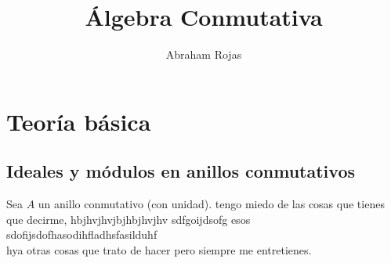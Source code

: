 \documentclass[12pt]{book}
\newtheorem{ex}{Ejercicio}
\begin{document}
\large
\title{Álgebra Conmutativa}	
	\author{Abraham Rojas}
	\date{ }
	
	\maketitle
	\tableofcontents

	

	
	
\part{Teoría básica}	
	
	
\chapter{Ideales y módulos en anillos conmutativos}

Sea $A$ un anillo conmutativo (con unidad). tengo miedo de las cosas que tienes que decirme, hbjhvjhvjbjhbjhvjhv sdfgoijdsofg esos sdofijsdofhasodihfladhsfasilduhf \\
hya otras cosas que trato de hacer pero siempre me entretienes.
%
%
%
%
%
%
%
%
\end{document}
